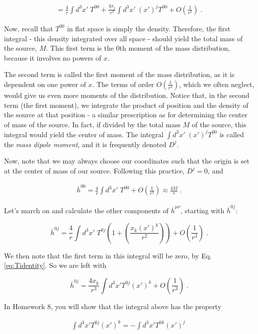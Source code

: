 \documentclass[10pt]{article}
\begin{document}
\begin{align}\label{eq:h00long}
= \frac{4}{r} \int d^3x' \; T^{00} + \frac{4 x_j}{r^3} \int d^3x' \; (x')^j T^{00} +  O\left(\frac{1}{r^3}\right) \; .
\end{align}
                
Now, recall that $T^{00}$ in flat space is simply the density. Therefore, the first integral - this density integrated over all space - should yield the total mass of the source, $M$. This first term is the 0th moment of the mass distribution, because it involves no powers of $x$. 

The second term is called the first moment of the mass distribution, as it is dependent on one power of $x$. The terms of order $ O\left( \frac{1}{r^3} \right)$, which we often neglect, would give us even more moments of the distribution. Notice that, in the second term (the first moment), we integrate the product of position and the density of the source at that position - a similar prescription as for determining the center of mass of the source. In fact, if divided by the total mass $M$ of the source, this integral would yield the center of mass. The integral $\int d^3x' \; (x')^j T^{00}$ is called the \textit{mass dipole moment}, and it is frequently denoted $D^j$. 

Now, note that we may always choose our coordinates such that the origin is set at the center of mass of our source. Following this practice, $D^j = 0$, and 

\begin{align}\label{eq:h00}
\overline{h}^{00} =\frac{4}{r} \int d^3x' \; T^{00} +  O\left(\frac{1}{r^3}\right) \approx \frac{4M}{r}\; .
\end{align}

Let's march on and calculate the other components of $\overline{h}^{\mu\nu}$, starting with $\overline{h}^{0j}$:

\[ \overline{h}^{0j} = \frac{4}{r} \int d^3x' \; T^{0j} \left( 1 + \left( \frac{x_k(x')^k}{r^2} \right) \right) + O\left(\frac{1}{r^3}\right) \; . \]

\noindent We then note that the first term in this integral will be zero, by Eq. \ref{eq:Tidentity}. So we are left with

\[ \overline{h}^{0j} = \frac{4x_k}{r^3} \int d^3x' T^{0j} (x')^k + O\left(\frac{1}{r^3}\right)\; . \]

In Homework 8, you will show that the integral above has the property

\begin{align}\label{HWidentity}
\int d^3x' T^{0j} (x')^k = - \int d^3x' T^{0k} (x')^j \;
\end{align}
\end{document}
